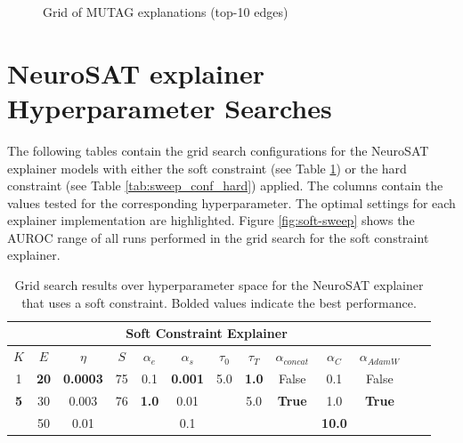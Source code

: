 \begin{figure}[htbp]
    \centering
    \caption{Grid of MUTAG explanations (top-10 edges)}
    \label{fig:grid-MUTAG-explanations}
\end{figure}

\clearpage
\section{NeuroSAT explainer Hyperparameter Searches}
\label{sec:neurSAT_sweeps}

The following tables contain the grid search configurations for the NeuroSAT explainer models with either the soft constraint (see Table \ref{tab:sweep_conf_soft}) or the hard constraint (see Table \ref{tab:sweep_conf_hard}) applied. The columns contain the values tested for the corresponding hyperparameter. The optimal settings for each explainer implementation are highlighted. Figure \ref{fig:soft-sweep} shows the AUROC range of all runs performed in the grid search for the soft constraint explainer.

\begin{table}[h]
  \centering
  \scriptsize
  \begin{tabular}{|c|c|c|c|c|c|c|c|c|c|c|c|c|}
  \hline
  \multicolumn{11}{|c|}{\textbf{Soft Constraint Explainer}} \\ \hline
  $K$ & $E$ & $\eta$ & $S$ & $\alpha_e$ & $\alpha_s$ & $\tau_0$ & $\tau_T$ & $\alpha_{concat}$ & $\alpha_C$ & $\alpha_{AdamW}$ \\ \hline
  1 & \textbf{20} & \textbf{0.0003} & 75 & 0.1 & \textbf{0.001} & 5.0 & \textbf{1.0} & False & 0.1 & False\\ 
  \textbf{5} & 30 & 0.003 & 76 & \textbf{1.0} & 0.01 &  & 5.0 & \textbf{True} & 1.0 & \textbf{True}\\ 
   & 50 & 0.01 &  &  & 0.1 &  &  &  & \textbf{10.0} & \\ \hline
  \end{tabular}
  \caption[NeuroSAT soft constraint grid search]{Grid search results over hyperparameter space for the NeuroSAT explainer that uses a soft constraint. Bolded values indicate the best performance.}
  \label{tab:sweep_conf_soft}
\end{table}

